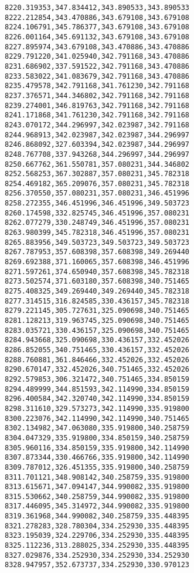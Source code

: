 \documentclass[11pt]{article}
\begin{document}
\begin{Verbatim}[commandchars=\\\{\}]
8220.319353,347.834412,343.890533,343.890533
8222.212854,343.470886,343.679108,343.679108
8224.106791,345.786377,343.679108,343.679108
8226.001164,345.691132,343.679108,343.679108
8227.895974,343.679108,343.470886,343.470886
8229.791220,341.025940,342.791168,343.470886
8231.686902,337.591522,342.791168,343.470886
8233.583022,341.083679,342.791168,343.470886
8235.479578,342.791168,341.761230,342.791168
8237.376571,344.346802,342.791168,342.791168
8239.274001,346.819763,342.791168,342.791168
8241.171868,341.761230,342.791168,342.791168
8243.070172,344.296997,342.023987,342.791168
8244.968913,342.023987,342.023987,344.296997
8246.868092,327.603394,342.023987,344.296997
8248.767708,337.943268,344.296997,344.296997
8250.667762,361.550781,357.080231,344.346802
8252.568253,367.302887,357.080231,345.782318
8254.469182,365.209076,357.080231,345.782318
8256.370550,357.080231,357.080231,346.451996
8258.272355,346.451996,346.451996,349.503723
8260.174598,332.825745,346.451996,357.080231
8262.077279,330.248749,346.451996,357.080231
8263.980399,345.782318,346.451996,357.080231
8265.883956,349.503723,349.503723,349.503723
8267.787953,357.608398,357.608398,349.269440
8269.692388,371.160065,357.608398,346.451996
8271.597261,374.650940,357.608398,345.782318
8273.502574,371.603180,357.608398,340.751465
8275.408325,349.269440,349.269440,345.782318
8277.314515,316.824585,330.436157,345.782318
8279.221145,305.727631,325.090698,340.751465
8281.128213,319.963745,325.090698,340.751465
8283.035721,330.436157,325.090698,340.751465
8284.943668,325.090698,330.436157,332.452026
8286.852055,340.751465,330.436157,332.452026
8288.760881,361.846466,332.452026,332.452026
8290.670147,332.452026,340.751465,332.452026
8292.579853,306.321472,340.751465,334.850159
8294.489999,344.851593,342.114990,334.850159
8296.400584,342.320740,342.114990,334.850159
8298.311610,329.573273,342.114990,335.919800
8300.223076,342.114990,342.114990,340.751465
8302.134982,347.063080,335.919800,340.258759
8304.047329,335.919800,334.850159,340.258759
8305.960116,334.850159,335.919800,342.114990
8307.873344,330.466766,335.919800,342.114990
8309.787012,326.451355,335.919800,340.258759
8311.701121,348.908142,340.258759,335.919800
8313.615671,347.094147,344.990082,335.919800
8315.530662,340.258759,344.990082,335.919800
8317.446095,345.314972,344.990082,335.919800
8319.361968,344.990082,340.258759,335.448395
8321.278283,328.780304,334.252930,335.448395
8323.195039,324.229706,334.252930,335.448395
8325.112236,313.288025,334.252930,335.448395
8327.029876,334.252930,334.252930,334.252930
8328.947957,352.673737,334.252930,330.970123

\end{Verbatim}
\end{document}
